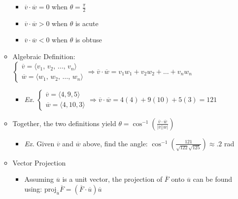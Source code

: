 \begin{itemize}
\begin{itemize}
\begin{itemize}
          \item $\overline{v}\cdot\overline{w} = 0$ when $\theta = \frac{\pi}{2}$

          \item $\overline{v}\cdot\overline{w} > 0$ when $\theta$ is acute

          \item $\overline{v}\cdot\overline{w} < 0$ when $\theta$ is obtuse

        \end{itemize}

      \item Algebraic Definition: $\left\{\begin{array}{c} \overline{v} = \langle v_1,\,v_2,\,\dots,\,v_n \rangle \\ \overline{w} = \langle w_1,\,w_2,\,\dots,\,w_n \rangle \end{array} \Rightarrow \overline{v}\cdot\overline{w} = v_1w_1 + v_2w_2 + \dots + v_nw_n$

          \begin{itemize}

            \item \textit{Ex.} $\left\{\begin{array}{c} \overline{v} = \langle 4, 9, 5 \rangle \\ \overline{w} = \langle 4, 10, 3 \rangle \end{array} \Rightarrow \overline{v}\cdot\overline{w} = 4(4) + 9(10) + 5(3) = 121$

          \end{itemize}

        \item Together, the two definitions yield $\theta = \cos^{-1}\left(\frac{\overline{v}\cdot\overline{w}}{|\overline{v}||\overline{w}|}\right)$

          \begin{itemize}

            \item \textit{Ex.} Given $\overline{v}$ and $\overline{w}$ above, find the angle: $\cos^{-1}\left( \frac{121}{\sqrt{122}\sqrt{125}} \right)\approx .2$ rad

          \end{itemize}

      \item Vector Projection

        \begin{itemize}

          \item Assuming $\overline{u}$ is a unit vector, the projection of $\overline{F}$ onto $\overline{u}$ can be found using: $\text{proj}_{\overline{u}}\overline{F}=\left( \overline{F}\cdot\overline{u} \right)\overline{u}$


\end{itemize}
\end{itemize}
\end{itemize}
